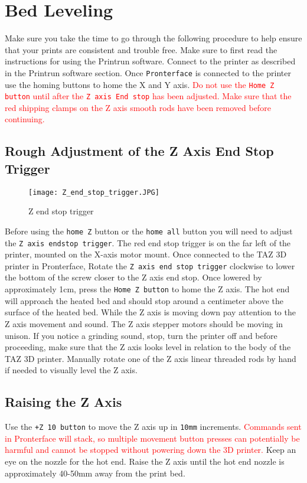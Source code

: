 \section{Bed Leveling}
Make sure you take the time to go through the following procedure to help ensure that your prints are consistent and trouble free. Make sure to first read the instructions for using the Printrun software. Connect to the printer as described in the Printrun software section. Once \texttt{Pronterface} is connected to the printer use the homing buttons to home the X and Y axis. \textcolor{red}{Do not use the \texttt{Home Z button} until after the \texttt{Z axis End stop} has been adjusted. Make sure that the red shipping clamps on the Z axis smooth rods have been removed before continuing.}

\subsection{Rough Adjustment of the Z Axis End Stop Trigger}
\begin{figure}[H]
\centering
\texttt{[image: Z\_end\_stop\_trigger.JPG]}
\caption{Z end stop trigger}
\label{fig:Z_end_stop_trigger}
\end{figure}
Before using the \texttt{home Z} button or the \texttt{home all} button you will need to adjust the \texttt{Z axis endstop trigger}. The red end stop trigger is on the far left of the printer, mounted on the X-axis motor mount. Once connected to the TAZ 3D printer in Pronterface, Rotate the \texttt{Z axis end stop trigger} clockwise to lower the bottom of the screw closer to the Z axis end stop. Once lowered by approximately 1cm, press the \texttt{Home Z button} to home the Z axis. The hot end will approach the heated bed and should stop around a centimeter above the surface of the heated bed. While the Z axis is moving down pay attention to the Z axis movement and sound. The Z axis stepper motors should be moving in unison. If you notice a grinding sound, stop, turn the printer off and before proceeding, make sure that the Z axis looks level in relation to the body of the TAZ 3D printer. Manually rotate one of the Z axis linear threaded rods by hand if needed to visually level the Z axis.

\subsection{Raising the Z Axis}
Use the \texttt{+Z 10 button} to move the Z axis up in \texttt{10mm} increments. \textcolor{red}{Commands sent in Pronterface will stack, so multiple movement button presses can potentially be harmful and cannot be stopped without powering down the 3D printer.} Keep an eye on the nozzle for the hot end. Raise the Z axis until the hot end nozzle is approximately 40-50mm away from the print bed.

